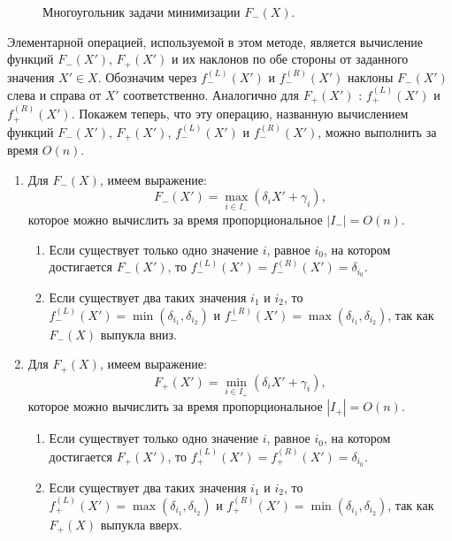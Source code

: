 \documentclass[12pt,a4paper]{article}
\begin{document}
\begin{figure}[h]
\caption{Многоугольник задачи минимизации $ F_{-}(X)$.}
\label{ris:main2}
\end{figure}

Элементарной операцией, используемой в этом методе, является вычисление функций $F_{-}(X')$, $F_{+}(X')$ и их наклонов по обе стороны от заданного значения $X'\in X$. Обозначим через $f_{-}^{(L)}(X')$ и $f_{-}^{(R)}(X')$ наклоны  $F_{-}(X')$ слева и справа от $ X'$ соответственно. Аналогично для $F_{+}(X')$ : $f_{+}^{(L)}(X')$ и $f_{+}^{(R)}(X')$. Покажем теперь, что эту операцию, названную вычислением функций $F_{-}(X')$, $F_{+}(X')$, $f_{-}^{(L)}(X')$ и $f_{-}^{(R)}(X')$, можно выполнить за время $O( n)$.\par
\begin{enumerate}
\item Для $F_{-}(X)$, имеем выражение:
\[
F_{-}(X')=\max_{ i\in I_{-}}(\delta_{i}X'+\gamma_{i}),
\]
которое можно вычислить за время пропорциональное $| I_{-}|=O( n)$.
\begin{enumerate} 
\item Если существует только одно значение $i$, равное $i_{0}$, на котором достигается $F_{-}(X')$, то $f_{-}^{(L)}(X')=f_{-}^{(R)}(X')=\delta_{i_{0}}$.
\item Если существует два таких значения $i_{1}$ и $i_{2}$, то $f_{-}^{(L)}(X')=\min (\delta_{i_{1}},\delta_{i_{2}})$ и $f_{-}^{(R)}(X')=\max (\delta_{i_{1}},\delta_{i_{2}})$, так как  $F_{-}(X)$ выпукла вниз.\par
\end{enumerate}
\item Для $F_{+}(X)$, имеем выражение:
\[
F_{+}(X')=\min_{ i\in I_{+}}(\delta_{i}X'+\gamma_{i}),
\]
которое можно вычислить за время пропорциональное $| I_{+}|=O( n)$. 
\begin{enumerate}
\item Если существует только одно значение $i$, равное $i_{0}$, на котором достигается $F_{+}(X')$, то $f_{+}^{(L)}(X')=f_{+}^{(R)}(X')=\delta_{i_{0}}$.
\item Если существует два таких значения $i_{1}$ и $i_{2}$, то $f_{+}^{(L)}(X')=\max (\delta_{i_{1}},\delta_{i_{2}})$ и $f_{+}^{(R)}(X')=\min (\delta_{i_{1}},\delta_{i_{2}})$, так как  $F_{+}(X)$ выпукла вверх.\par
\end{enumerate}
\end{enumerate}
\end{document}

